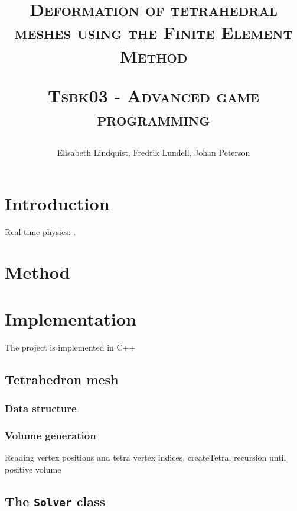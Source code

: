 \documentclass[10pt,a4paper]{article}
\author{Elisabeth Lindquist, Fredrik Lundell, Johan Peterson}
\title{\textsc{Deformation of tetrahedral meshes using the Finite Element Method}\\\begin{small}\textsc{Tsbk03 - Advanced game programming}\end{small}}
\begin{document}
\maketitle
\begin{abstract}

\end{abstract}
\pagebreak
\tableofcontents
\pagebreak

\section{Introduction}

Real time physics: \cite{rt_phys}.
\section{Method}

\subsection{}
\subsection{}
\subsection{}


\section{Implementation}
The project is implemented in C++ 

\subsection{Tetrahedron mesh}
\subsubsection{Data structure}
\subsubsection{Volume generation}
Reading vertex positions and tetra vertex indices, createTetra, recursion until positive volume

\subsection{The \texttt{Solver} class}
\end{document}
